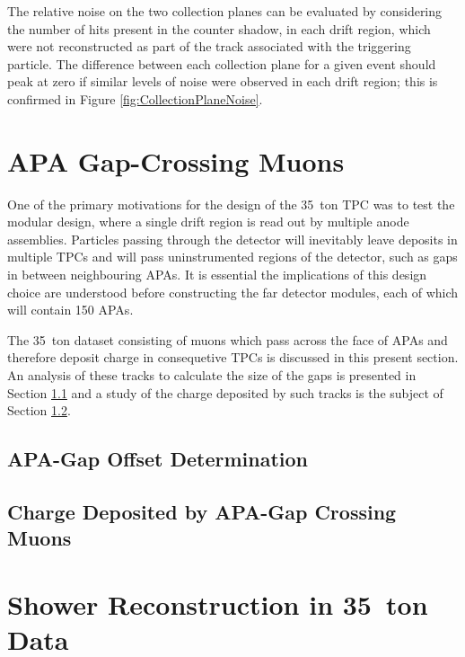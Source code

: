 The relative noise on the two collection planes can be evaluated by considering the number of hits present in the counter shadow, in each drift region, which were not reconstructed as part of the track associated with the triggering particle.  The difference between each collection plane for a given event should peak at zero if similar levels of noise were observed in each drift region; this is confirmed in Figure \ref{fig:CollectionPlaneNoise}.


\section{APA Gap-Crossing Muons}\label{sec:APAGapCrossing}

One of the primary motivations for the design of the 35~ton TPC was to test the modular design, where a single drift region is read out by multiple anode assemblies.  Particles passing through the detector will inevitably leave deposits in multiple TPCs and will pass uninstrumented regions of the detector, such as gaps in between neighbouring APAs.  It is essential the implications of this design choice are understood before constructing the far detector modules, each of which will contain 150 APAs.

The 35~ton dataset consisting of muons which pass across the face of APAs and therefore deposit charge in consequetive TPCs is discussed in this present section.  An analysis of these tracks to calculate the size of the gaps is presented in Section \ref{sec:APAGapOffsets} and a study of the charge deposited by such tracks is the subject of Section \ref{sec:APAGapCharge}.

\subsection{APA-Gap Offset Determination}\label{sec:APAGapOffsets}

\subsection{Charge Deposited by APA-Gap Crossing Muons}\label{sec:APAGapCharge}

\section{Shower Reconstruction in 35~ton Data}\label{sec:ShowerData}
